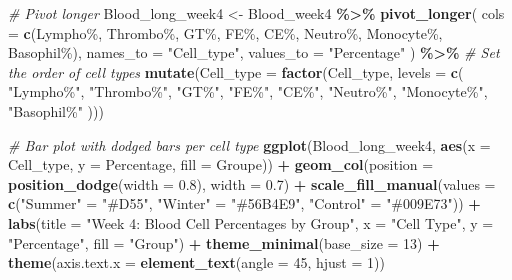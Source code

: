 \documentclass[
]{article}
\newenvironment{Shaded}{\begin{snugshade}}{\end{snugshade}}
\newcommand{\AttributeTok}[1]{\textcolor[rgb]{0.13,0.29,0.53}{#1}}
\newcommand{\CommentTok}[1]{\textcolor[rgb]{0.56,0.35,0.01}{\textit{#1}}}
\newcommand{\DecValTok}[1]{\textcolor[rgb]{0.00,0.00,0.81}{#1}}
\newcommand{\FloatTok}[1]{\textcolor[rgb]{0.00,0.00,0.81}{#1}}
\newcommand{\FunctionTok}[1]{\textcolor[rgb]{0.13,0.29,0.53}{\textbf{#1}}}
\newcommand{\NormalTok}[1]{#1}
\newcommand{\OtherTok}[1]{\textcolor[rgb]{0.56,0.35,0.01}{#1}}
\newcommand{\SpecialCharTok}[1]{\textcolor[rgb]{0.81,0.36,0.00}{\textbf{#1}}}
\newcommand{\StringTok}[1]{\textcolor[rgb]{0.31,0.60,0.02}{#1}}
\begin{document}
\begin{Shaded}
\begin{Highlighting}[]
\CommentTok{\# Pivot longer}
\NormalTok{Blood\_long\_week4 }\OtherTok{\textless{}{-}}\NormalTok{ Blood\_week4 }\SpecialCharTok{\%\textgreater{}\%}
  \FunctionTok{pivot\_longer}\NormalTok{(}
    \AttributeTok{cols =} \FunctionTok{c}\NormalTok{(}\StringTok{\textasciigrave{}}\AttributeTok{Lympho\%}\StringTok{\textasciigrave{}}\NormalTok{, }\StringTok{\textasciigrave{}}\AttributeTok{Thrombo\%}\StringTok{\textasciigrave{}}\NormalTok{, }\StringTok{\textasciigrave{}}\AttributeTok{GT\%}\StringTok{\textasciigrave{}}\NormalTok{, }\StringTok{\textasciigrave{}}\AttributeTok{FE\%}\StringTok{\textasciigrave{}}\NormalTok{, }\StringTok{\textasciigrave{}}\AttributeTok{CE\%}\StringTok{\textasciigrave{}}\NormalTok{, }\StringTok{\textasciigrave{}}\AttributeTok{Neutro\%}\StringTok{\textasciigrave{}}\NormalTok{, }\StringTok{\textasciigrave{}}\AttributeTok{Monocyte\%}\StringTok{\textasciigrave{}}\NormalTok{, }\StringTok{\textasciigrave{}}\AttributeTok{Basophil\%}\StringTok{\textasciigrave{}}\NormalTok{),}
    \AttributeTok{names\_to =} \StringTok{"Cell\_type"}\NormalTok{,}
    \AttributeTok{values\_to =} \StringTok{"Percentage"}
\NormalTok{  ) }\SpecialCharTok{\%\textgreater{}\%}
  \CommentTok{\# Set the order of cell types}
  \FunctionTok{mutate}\NormalTok{(}\AttributeTok{Cell\_type =} \FunctionTok{factor}\NormalTok{(Cell\_type, }\AttributeTok{levels =} \FunctionTok{c}\NormalTok{(}
    \StringTok{"Lympho\%"}\NormalTok{, }\StringTok{"Thrombo\%"}\NormalTok{, }\StringTok{"GT\%"}\NormalTok{, }\StringTok{"FE\%"}\NormalTok{, }\StringTok{"CE\%"}\NormalTok{, }\StringTok{"Neutro\%"}\NormalTok{, }\StringTok{"Monocyte\%"}\NormalTok{, }\StringTok{"Basophil\%"}
\NormalTok{  )))}

\CommentTok{\# Bar plot with dodged bars per cell type}
\FunctionTok{ggplot}\NormalTok{(Blood\_long\_week4, }\FunctionTok{aes}\NormalTok{(}\AttributeTok{x =}\NormalTok{ Cell\_type, }\AttributeTok{y =}\NormalTok{ Percentage, }\AttributeTok{fill =}\NormalTok{ Groupe)) }\SpecialCharTok{+}
  \FunctionTok{geom\_col}\NormalTok{(}\AttributeTok{position =} \FunctionTok{position\_dodge}\NormalTok{(}\AttributeTok{width =} \FloatTok{0.8}\NormalTok{), }\AttributeTok{width =} \FloatTok{0.7}\NormalTok{) }\SpecialCharTok{+}
  \FunctionTok{scale\_fill\_manual}\NormalTok{(}\AttributeTok{values =} \FunctionTok{c}\NormalTok{(}\StringTok{"Summer"} \OtherTok{=} \StringTok{"\#D55"}\NormalTok{, }\StringTok{"Winter"} \OtherTok{=} \StringTok{"\#56B4E9"}\NormalTok{, }\StringTok{"Control"} \OtherTok{=} \StringTok{"\#009E73"}\NormalTok{)) }\SpecialCharTok{+}
  \FunctionTok{labs}\NormalTok{(}\AttributeTok{title =} \StringTok{"Week 4: Blood Cell Percentages by Group"}\NormalTok{,}
       \AttributeTok{x =} \StringTok{"Cell Type"}\NormalTok{, }\AttributeTok{y =} \StringTok{"Percentage"}\NormalTok{, }\AttributeTok{fill =} \StringTok{"Group"}\NormalTok{) }\SpecialCharTok{+}
  \FunctionTok{theme\_minimal}\NormalTok{(}\AttributeTok{base\_size =} \DecValTok{13}\NormalTok{) }\SpecialCharTok{+}
  \FunctionTok{theme}\NormalTok{(}\AttributeTok{axis.text.x =} \FunctionTok{element\_text}\NormalTok{(}\AttributeTok{angle =} \DecValTok{45}\NormalTok{, }\AttributeTok{hjust =} \DecValTok{1}\NormalTok{))}
\end{Highlighting}
\end{Shaded}
\end{document}
